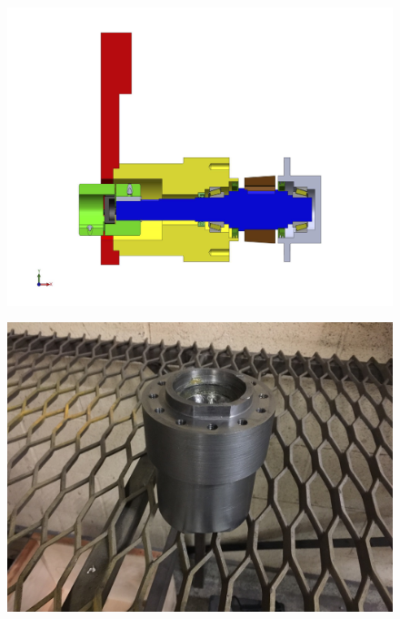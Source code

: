 \begin{figure}[H]
\centering
\begin{minipage}{0.45\linewidth}
\centering
\includegraphics[width=0.9\linewidth]{./images/pivot_assembly_drw}
\label{fig:pivot_assembly_drw}
\end{minipage}
\begin{minipage}{0.45\linewidth}
\centering
\includegraphics[width=0.9\linewidth]{./images/pivot_bld}
\label{fig:pivot_bld}
\end{minipage}
\end{figure}

